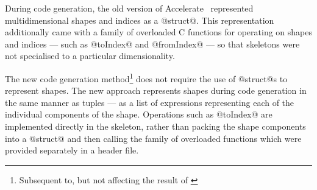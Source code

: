 During code generation, the old version of Accelerate~\cite{Chakravarty:2011fr}
represented multidimensional shapes and indices as a @struct@.
%
%
This representation additionally came with a family of overloaded C functions
for operating on shapes and indices --- such as @toIndex@ and
@fromIndex@ --- so that skeletons were not specialised to a particular
dimensionality.
%

The new code generation method\footnote{Subsequent to, but not affecting the
result of \cite{CliftonEverest:2014vi}} does not require the use of @struct@s to
represent shapes. The new approach represents shapes during code generation in
the same manner as tuples --- as a list of expressions representing each of the
individual components of the shape. Operations such as @toIndex@ are implemented
directly in the skeleton, rather than packing the shape components into a
@struct@ and then calling the family of overloaded functions which were provided
separately in a header file.

